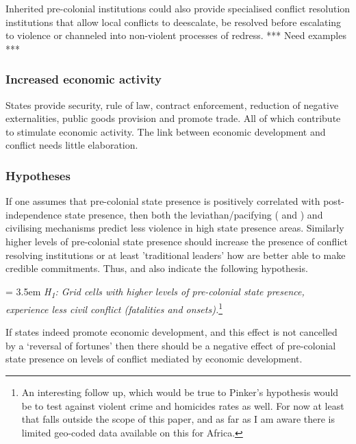 \documentclass[12pt]{article}
\begin{document}
Inherited pre-colonial institutions could also provide specialised conflict
resolution institutions that allow local conflicts to deescalate, be resolved
before escalating to violence or channeled into non-violent processes of
redress. *** Need examples ***

\subsubsection{Increased economic activity}

States provide security, rule of law, contract enforcement, reduction of
negative externalities, public goods provision and promote trade. All of which
contribute to stimulate economic activity. The link between economic development
and conflict needs little elaboration. 


\subsubsection{Hypotheses}

If one assumes that pre-colonial state presence is positively correlated with
post-independence state presence, then both the leviathan/pacifying
(\citet{Tilly1990} and \citet{Pinker2012}) and civilising \citep{Pinker2012}
mechanisms predict less violence in high state presence areas. Similarly higher
levels of pre-colonial state presence should increase the presence of conflict
resolving institutions or at least 'traditional leaders' how are better able to
make credible commitments. Thus, \citet{Wig2016} and
\citet{Depetris-Chauvin2016} also indicate the following hypothesis.

\bigskip

\hangindent = 3.5em \textit{H\textsubscript{1}: Grid cells with higher levels of
	pre-colonial state presence, experience less civil conflict (fatalities
	and onsets).}\footnote{An interesting follow up, which would be true to
	Pinker's hypothesis would be to test against violent crime and homicides
rates as well. For now at least that falls outside the scope of this paper, and
as far as I am aware there is limited geo-coded data available on this for
Africa.} 

\bigskip

If states indeed promote economic development, and this effect is not cancelled
by a `reversal of fortunes' then there should be a negative effect of
pre-colonial state presence on levels of  conflict mediated by economic
development. 
\end{document}
